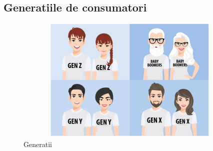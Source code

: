 \documentclass[a4paper, 12pt]{article}
\begin{document}
		\subsection{Generatiile de consumatori}
			\begin{figure}[!htb]
			\centering
			\includegraphics[width=13cm, height=6cm]{"figures/generatii.png"}
			\caption{Generatii}
		\end{figure}
		
\end{document}
